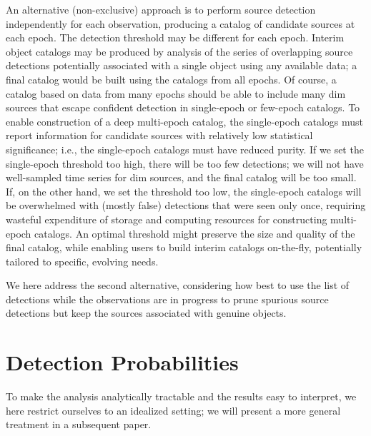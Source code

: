\documentclass[twocolumn]{emulateapj}
\begin{document}
An alternative (non-exclusive) approach is to perform source detection independently for each observation, producing a catalog of candidate sources at each epoch.
The detection threshold may be different for each epoch. 
Interim object catalogs may be produced by analysis of the series of overlapping source detections potentially associated with a single object using any available data; a final catalog would be built using the catalogs from all epochs.
Of course, a catalog based on data from many epochs should be able to include many dim sources that escape confident detection in single-epoch or few-epoch catalogs.
To enable construction of a deep multi-epoch catalog, the single-epoch catalogs must report information for candidate sources with relatively low statistical significance; i.e., the single-epoch catalogs must have reduced purity.
If we set the single-epoch threshold too high, there will be too few detections; we will not have well-sampled time series for dim sources, and the final catalog will be too small.
If, on the other hand, we set the threshold too low, the single-epoch catalogs will be overwhelmed with (mostly false) detections that were seen only once, requiring wasteful expenditure of storage and computing resources for constructing multi-epoch catalogs.
An optimal threshold might preserve the size and quality of the final catalog, while enabling users to build interim catalogs on-the-fly, potentially tailored to specific, evolving needs.

We here address the second alternative, considering how best to use the list of detections while the observations are in progress to prune spurious source detections but keep the sources associated with genuine objects.


\section{Detection Probabilities} 
\label{sec:det}

\noindent 
To make the analysis analytically tractable and the results easy to interpret, we here restrict ourselves to an idealized setting; we will present a more general treatment in a subsequent paper.
\end{document}
